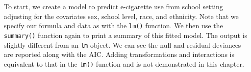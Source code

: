 \documentclass[
  letterpaper,
]{latex/krantz}
\makeatletter
\newenvironment{Shaded}{\begin{snugshade}}{\end{snugshade}}
\newcommand{\CommentTok}[1]{\textcolor[rgb]{0.37,0.37,0.37}{#1}}
\newcommand{\FunctionTok}[1]{\textcolor[rgb]{0.28,0.35,0.67}{#1}}
\newcommand{\NormalTok}[1]{\textcolor[rgb]{0.00,0.23,0.31}{#1}}
\newcommand{\OtherTok}[1]{\textcolor[rgb]{0.00,0.23,0.31}{#1}}
\newcommand{\SpecialCharTok}[1]{\textcolor[rgb]{0.37,0.37,0.37}{#1}}
\newcommand{\StringTok}[1]{\textcolor[rgb]{0.13,0.47,0.30}{#1}}
\newenvironment{kframe}{%
\medskip{}
\setlength{\fboxsep}{.8em}
 \def\at@end@of@kframe{}%
 \ifinner\ifhmode%
  \def\at@end@of@kframe{\end{minipage}}%
  \begin{minipage}{\columnwidth}%
 \fi\fi%
 \def\FrameCommand##1{\hskip\@totalleftmargin \hskip-\fboxsep
 \colorbox{shadecolor}{##1}\hskip-\fboxsep
     \hskip-\linewidth \hskip-\@totalleftmargin \hskip\columnwidth}%
 \MakeFramed {\advance\hsize-\width
   \@totalleftmargin\z@ \linewidth\hsize
   \@setminipage}}%
 {\par\unskip\endMakeFramed%
 \at@end@of@kframe}
\renewenvironment{Shaded}{\begin{kframe}}{\end{kframe}}
\makeatother
\begin{document}
\begin{Shaded}
\end{Shaded}

To start, we create a model to predict e-cigarette use from school
setting adjusting for the covariates sex, school level, race, and
ethnicity. Note that we specify our formula and data as with the
\texttt{lm()} function. We then use the
\texttt{summary()}
function again to print a summary of this fitted model. The output is
slightly different from an \texttt{lm} object. We can see the null and
residual deviances are reported along with the AIC. Adding
transformations and interactions is equivalent to that in the
\texttt{lm()} function and is not demonstrated in this chapter.
\end{document}
